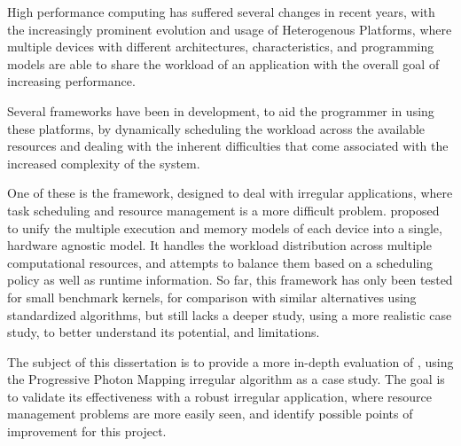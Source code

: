 \documentclass[main.tex]{subfiles}
\begin{document}
High performance computing has suffered several changes in recent years, with the increasingly prominent evolution and usage of Heterogenous Platforms, where multiple devices with different architectures, characteristics, and programming models are able to share the workload of an application with the overall goal of increasing performance.

Several frameworks have been in development, to aid the programmer in using these platforms, by dynamically scheduling the workload across the available resources and dealing with the inherent difficulties that come associated with the increased complexity of the system.

One of these is the \gama framework, designed to deal with irregular applications, where task scheduling and resource management is a more difficult problem. \gama proposed to unify the multiple execution and memory models of each device into a single, hardware agnostic model. It handles the workload distribution across multiple computational resources, and attempts to balance them based on a scheduling policy as well as runtime information. So far, this framework has only been tested for small benchmark kernels, for comparison with similar alternatives using standardized algorithms, but still lacks a deeper study, using a more realistic case study, to better understand its potential, and limitations.

The subject of this dissertation is to provide a more in-depth evaluation of \gama, using the Progressive Photon Mapping irregular algorithm as a case study. The goal is to validate its effectiveness with a robust irregular application, where resource management problems are more easily seen, and identify possible points of improvement for this project.

\newpage
{}
\end{document}
